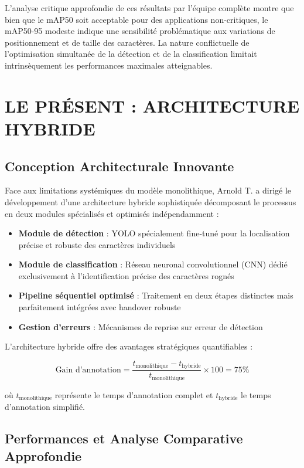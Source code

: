 \documentclass[letterpaper, 10 pt, conference]{ieeeconf}
\begin{document}
L'analyse critique approfondie de ces résultats par l'équipe complète montre que bien que le mAP50 soit acceptable pour des applications non-critiques, le mAP50-95 modeste indique une sensibilité problématique aux variations de positionnement et de taille des caractères. La nature conflictuelle de l'optimisation simultanée de la détection et de la classification limitait intrinsèquement les performances maximales atteignables.

\section{LE PRÉSENT : ARCHITECTURE HYBRIDE}

\subsection{Conception Architecturale Innovante}

Face aux limitations systémiques du modèle monolithique, Arnold T. a dirigé le développement d'une architecture hybride sophistiquée décomposant le processus en deux modules spécialisés et optimisés indépendamment :

\begin{itemize}
\item \textbf{Module de détection} : YOLO spécialement fine-tuné pour la localisation précise et robuste des caractères individuels
\item \textbf{Module de classification} : Réseau neuronal convolutionnel (CNN) dédié exclusivement à l'identification précise des caractères rognés
\item \textbf{Pipeline séquentiel optimisé} : Traitement en deux étapes distinctes mais parfaitement intégrées avec handover robuste
\item \textbf{Gestion d'erreurs} : Mécanismes de reprise sur erreur de détection
\end{itemize}

L'architecture hybride offre des avantages stratégiques quantifiables :

\begin{equation}
\text{Gain d'annotation} = \frac{t_{\text{monolithique}} - t_{\text{hybride}}}{t_{\text{monolithique}}} \times 100 = 75\%
\end{equation}

où $t_{\text{monolithique}}$ représente le temps d'annotation complet et $t_{\text{hybride}}$ le temps d'annotation simplifié.

\subsection{Performances et Analyse Comparative Approfondie}
\end{document}
